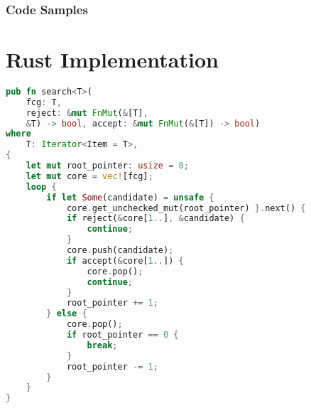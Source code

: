 \documentclass[runningheads]{llncs}
\begin{document}
\subsubsection{Code Samples}

\appendix

\section{Rust Implementation}
\begin{lstlisting}[language=Rust, style=boxed]
pub fn search<T>(
	fcg: T,
	reject: &mut FnMut(&[T], 
	&T) -> bool, accept: &mut FnMut(&[T]) -> bool)
where
    T: Iterator<Item = T>,
{
    let mut root_pointer: usize = 0;
    let mut core = vec![fcg];
    loop {
        if let Some(candidate) = unsafe {
        	core.get_unchecked_mut(root_pointer) }.next() {
            if reject(&core[1..], &candidate) {
                continue;
            }
            core.push(candidate);
            if accept(&core[1..]) {
                core.pop();
                continue;
            }
            root_pointer += 1;
        } else {
            core.pop();
            if root_pointer == 0 {
                break;
            }
            root_pointer -= 1;
        }
    }
}
\end{lstlisting}
\end{document}
